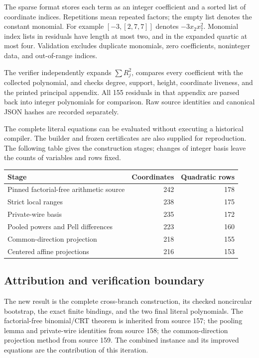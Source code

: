 \documentclass[11pt,letterpaper]{article}
\theoremstyle{remark}
\begin{document}
The sparse format stores each term as an integer coefficient
and a sorted list of coordinate indices. Repetitions mean
repeated factors; the empty list denotes the constant monomial.
For example \([{-}3,[2,7,7]]\) denotes \(-3x_2x_7^2\).
Monomial index lists in residuals have length at most two, and
in the expanded quartic at most four. Validation excludes duplicate monomials, zero
coefficients, noninteger data, and out-of-range indices.

The verifier independently expands \(\sum R_j^2\), compares
every coefficient with the collected polynomial, and checks
degree, support, height, coordinate liveness, and the printed
principal appendix. All 155 residuals in that appendix are
parsed back into integer polynomials for comparison.
Raw source identities and canonical JSON hashes are recorded
separately.

The complete literal equations can be evaluated without
executing a historical compiler. The builder and frozen
certificates are also supplied for reproduction.
The following table gives the construction stages; changes
of integer basis leave the counts of variables and rows fixed.

\begin{center}\small
\begin{tabular}{lrr}
\toprule
Stage&Coordinates&Quadratic rows\\
\midrule
Pinned factorial-free arithmetic source&242&178\\
Strict local ranges&238&175\\
Private-wire basis&235&172\\
Pooled powers and Pell differences&223&160\\
Common-direction projection&218&155\\
Centered affine projections&216&153\\
\bottomrule
\end{tabular}
\end{center}

\subsection{Attribution and verification boundary}

The new result is the complete cross-branch construction, its
checked noncircular bootstrap, the exact finite bindings, and
the two final literal polynomials. The factorial-free
binomial/CRT theorem is inherited from source 157; the pooling
lemma and private-wire identities from source 158; the
common-direction projection method from source 159.
The combined instance and its improved equations are the
contribution of this iteration.
\end{document}
